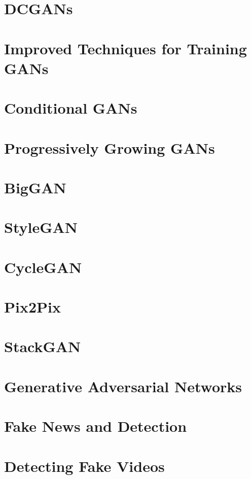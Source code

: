 \documentclass[11pt,fleqn]{book} %
\begin{document}
\chapter{DCGANs}
\chapter{Improved Techniques for Training GANs}
\chapter{Conditional GANs}
\chapter{Progressively Growing GANs}
\chapter{BigGAN}
\chapter{StyleGAN}
\chapter{CycleGAN}
\chapter{Pix2Pix}
\chapter{StackGAN}
\chapter{Generative Adversarial Networks}
\chapter{Fake News and Detection}
\chapter{Detecting Fake Videos}


\end{document}
